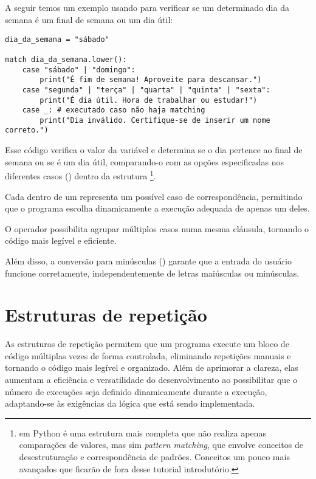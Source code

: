 \subsection{}
A seguir temos um exemplo usando  para verificar se um determinado dia da semana é um final de
semana ou um dia útil:
\begin{verbatim}
dia_da_semana = "sábado"

match dia_da_semana.lower():
    case "sábado" | "domingo":
        print("É fim de semana! Aproveite para descansar.")
    case "segunda" | "terça" | "quarta" | "quinta" | "sexta":
        print("É dia útil. Hora de trabalhar ou estudar!")
    case _: # executado caso não haja matching
        print("Dia inválido. Certifique-se de inserir um nome correto.")
\end{verbatim}

Esse código verifica o valor da variável  e determina se o dia pertence ao final de semana ou
se é um dia útil, comparando-o com as opções especificadas nos diferentes casos () dentro da estrutura
\footnote{em Python
 é uma estrutura mais completa que não realiza apenas comparações de valores, mas sim
\emph{pattern matching}, que envolve conceitos de desestruturação e correspondência de padrões. Conceitos um pouco mais avançados que ficarão de fora desse tutorial introdutório.}.


Cada  dentro de um  representa um possível caso de correspondência, permitindo que o
programa escolha dinamicamente a execução adequada de apenas um deles.

O operador \inlcode{|} possibilita agrupar múltiplos casos numa mesma cláusula, tornando o código mais legível e eficiente.

Além disso, a conversão para minúsculas () garante que a entrada do usuário funcione corretamente,
independentemente de letras maiúsculas ou minúsculas.





\section{Estruturas de repetição}\label{for}

As estruturas de repetição permitem que um programa execute um bloco de código múltiplas vezes de forma
controlada, eliminando repetições manuais e tornando o código mais legível e organizado.
Além de aprimorar a clareza, elas aumentam a eficiência e versatilidade do desenvolvimento ao possibilitar
que o número de execuções seja definido dinamicamente durante a execução,
adaptando-se às exigências da lógica que está sendo implementada.

